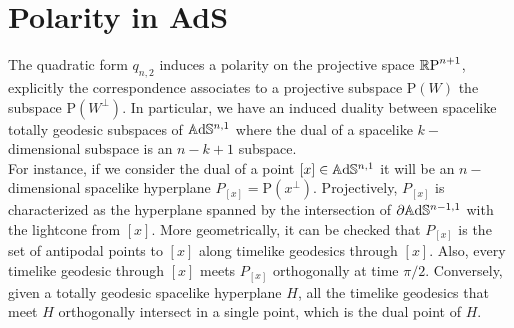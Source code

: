 \section{Polarity in AdS}\label{polarsec}
The quadratic form $q_{n,2}$ induces a polarity on the projective space $\mathbb{R}\text{P}^{n+1}$, explicitly the correspondence associates to a projective subspace $\text{P}(W)$ the subspace $\text{P}(W^\perp)$. In particular, we have an induced duality between spacelike totally geodesic subspaces of $\mathbb{A}\mathrm{d}\mathbb{S}^{n,1}$ where the dual of a spacelike $k-$dimensional subspace is an $n-k+1$ subspace. \\
For instance, if we consider the dual of a point $[x]\in\mathbb{A}\mathrm{d}\mathbb{S}^{n,1}$ it will be an $n-$dimensional spacelike hyperplane $P_{[x]}=\text{P}(x^\perp).$ Projectively, $P_{[x]}$ is characterized as the hyperplane spanned by the intersection of $\partial\mathbb{A}\mathrm{d}\mathbb{S}^{n-1,1}$ with the lightcone from $[x]$. More geometrically, it can be checked that $P_{[x]}$ is the set of antipodal points to $[x]$ along timelike geodesics through $[x].$ Also, every timelike geodesic through $[x]$ meets $P_{[x]}$ orthogonally at time $\pi/2.$ Conversely, given a totally geodesic spacelike hyperplane $H$, all the timelike geodesics that meet $H$ orthogonally intersect in a single point, which is the dual point of $H$. 




